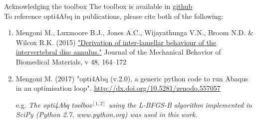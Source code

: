 \begin{frame}{Acknowledging the toolbox}
\vfill
The toolbox is available in \href{https://github.com/mengomarlene/opti4Abq}{github}\\[.5cm]
    
To reference opti4Abq in publications, please cite both of the following:
{\footnotesize
\begin{enumerate}
\item Mengoni M., Luxmoore B.J., Jones A.C., Wijayathunga V.N., Broom N.D. \& Wilcox R.K. (2015)
\href{http://dx.doi.org/10.1016/j.jmbbm.2015.03.028}{"Derivation of inter-lamellar behaviour of the intervertebral disc annulus."} Journal of the Mechanical Behavior of Biomedical Materials, v 48, 164–172

\item Mengoni M. (2017) "opti4Abq (v.2.0), a generic python code to run Abaqus in an optimisation loop". \url{http://dx.doi.org/10.5281/zenodo.557057}

\item[\color{black} e.g.]  {\it The opti4Abq toolbox$^{[1,2]}$ using the L-BFGS-B algorithm implemented in SciPy (Python 2.7, www.python.org) was used in this work.}
\end{enumerate}
}

\end{frame}
